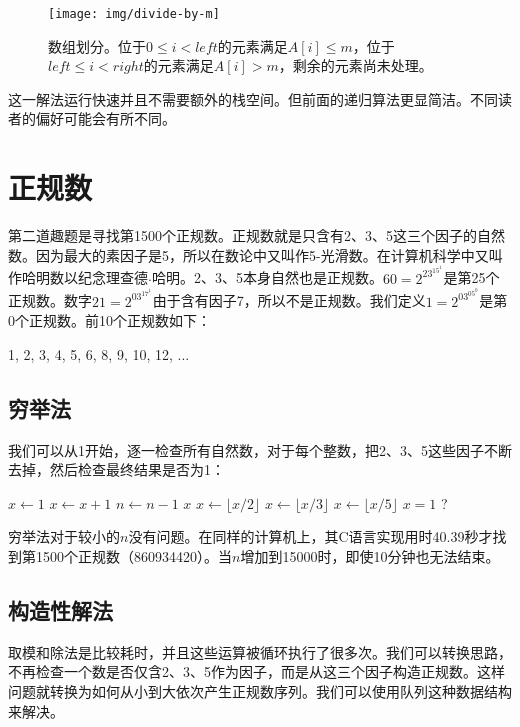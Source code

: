 \documentclass[b5paper]{ctexart}
\begin{document}
\begin{figure}[htbp]
  \centering
  \texttt{[image: img/divide-by-m]}
  \caption{数组划分。位于$0 \leq i < left$的元素满足$A[i] \leq m$，位于$left \leq i < right$的元素满足$A[i] > m$，剩余的元素尚未处理。}
  \label{fig:divide}
\end{figure}

这一解法运行快速并且不需要额外的栈空间。但前面的递归算法更显简洁。不同读者的偏好可能会有所不同。

\section*{正规数}

第二道趣题是寻找第1500个正规数。正规数就是只含有2、3、5这三个因子的自然数。因为最大的素因子是5，所以在数论中又叫作5-光滑数。在计算机科学中又叫作哈明数以纪念理查德$\cdot$哈明。2、3、5本身自然也是正规数。$60 = 2^23^15^1$是第25个正规数。数字$21 = 2^03^17^1$由于含有因子7，所以不是正规数。我们定义$1=2^03^05^0$是第0个正规数。前10个正规数如下：

1, 2, 3, 4, 5, 6, 8, 9, 10, 12, ...

\subsection*{穷举法}
我们可以从1开始，逐一检查所有自然数，对于每个整数，把2、3、5这些因子不断去掉，然后检查最终结果是否为1：

\begin{algorithmic}[1]
  \State $x \gets 1$
    \State $x \gets x + 1$
      \State $n \gets n - 1$
    \EndIf
  \EndWhile
  \State \Return $x$
\EndFunction
\Statex
{}
    \State $x \gets \lfloor x / 2 \rfloor$
  \EndWhile
    \State $x \gets \lfloor x / 3 \rfloor$
  \EndWhile
    \State $x \gets \lfloor x / 5 \rfloor$
  \EndWhile
  \State \Return $x = 1$ ?
\EndFunction
\end{algorithmic}

穷举法对于较小的$n$没有问题。在同样的计算机上，其C语言实现用时40.39秒才找到第1500个正规数（860934420）。当$n$增加到15000时，即使10分钟也无法结束。

\subsection*{构造性解法}
取模和除法是比较耗时\cite{Bentley}，并且这些运算被循环执行了很多次。我们可以转换思路，不再检查一个数是否仅含2、3、5作为因子，而是从这三个因子构造正规数。这样问题就转换为如何从小到大依次产生正规数序列。我们可以使用队列这种数据结构来解决。
\end{document}
